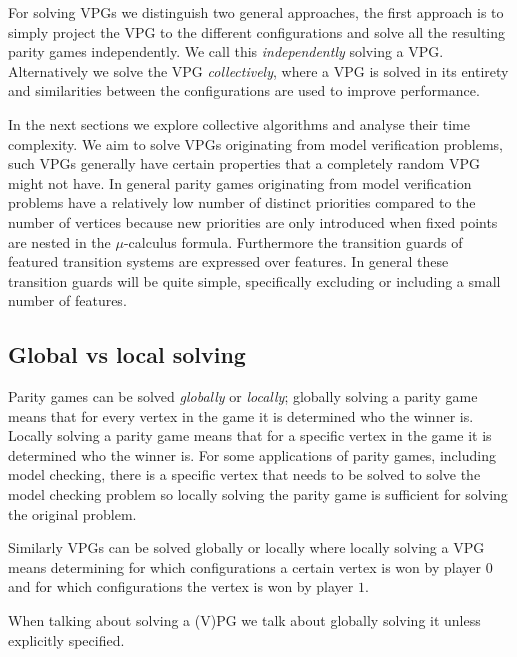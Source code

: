 For solving VPGs we distinguish two general approaches, the first approach is to simply project the VPG to the different configurations and solve all the resulting parity games independently. We call this \textit{independently} solving a VPG. Alternatively we solve the VPG \textit{collectively}, where a VPG is solved in its entirety and similarities between the configurations are used to improve performance. 

In the next sections we explore collective algorithms and analyse their time complexity. We aim to solve VPGs originating from model verification problems, such VPGs generally have certain properties that a completely random VPG might not have. In general parity games originating from model verification problems have a relatively low number of distinct priorities compared to the number of vertices because new priorities are only introduced when fixed points are nested in the $\mu$-calculus formula. Furthermore the transition guards of featured transition systems are expressed over features. In general these transition guards will be quite simple, specifically excluding or including a small number of features.

\subsection{Global vs local solving}
Parity games can be solved \textit{globally} or \textit{locally}; globally solving a parity game means that for every vertex in the game it is determined who the winner is. Locally solving a parity game means that for a specific vertex in the game it is determined who the winner is. For some applications of parity games, including model checking, there is a specific vertex that needs to be solved to solve the model checking problem so locally solving the parity game is sufficient for solving the original problem.

Similarly VPGs can be solved globally or locally where locally solving a VPG means determining for which configurations a certain vertex is won by player $0$ and for which configurations the vertex is won by player $1$.

When talking about solving a (V)PG we talk about globally solving it unless explicitly specified.